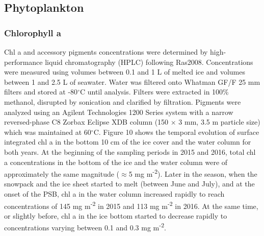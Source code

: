 \documentclass[essd, manuscript]{copernicus}
\begin{document}
\subsection{Phytoplankton}

\subsubsection{Chlorophyll a}

Chl a and accessory pigments concentrations were determined by high-performance liquid chromatography (HPLC) following Ras2008. Concentrations were measured using volumes between 0.1 and 1 L of melted ice and volumes between 1 and 2.5 L of seawater. Water was filtered onto Whatman GF/F 25 mm filters and stored at -80$^{\circ}$C until analysis. Filters were extracted in 100\% methanol, disrupted by sonication and clarified by filtration. Pigments were analyzed using an Agilent Technologies 1200 Series system with a narrow reversed-phase C8 Zorbax Eclipse XDB column (150 $\times$ 3 mm, 3.5 \textmu m particle size) which was maintained at 60$^{\circ}$C. Figure 10 shows the temporal evolution of surface integrated chl a in the bottom 10 cm of the ice cover and the water column for both years. At the beginning of the sampling periods in 2015 and 2016, total chl a concentrations in the bottom of the ice and the water column were of approximately the same magnitude ($\approx$5 mg m\textsuperscript{-2}). Later in the season, when the snowpack and the ice sheet started to melt (between June and July), and at the onset of the PSB, chl a in the water column increased rapidly to reach concentrations of 145 mg m\textsuperscript{-2} in 2015 and 113 mg m\textsuperscript{-2} in 2016. At the same time, or slightly before, chl a in the ice bottom started to decrease rapidly to concentrations varying between 0.1 and 0.3 mg m\textsuperscript{-2}. 
\end{document}
